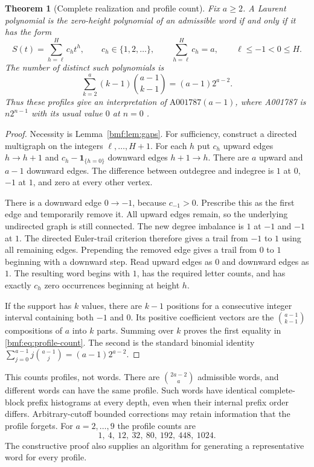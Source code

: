 \documentclass[11pt]{article}
\numberwithin{equation}{section}
\newtheorem{theorem}{Theorem}[section]
\theoremstyle{definition}
\theoremstyle{remark}
\begin{document}
\begin{theorem}[Complete realization and profile count]
\label{bmf:thm:realization}
Fix $a\geq2$. A Laurent polynomial is the zero-height polynomial of
an admissible word if and only if it has the form
\[
 S(t)=\sum_{h=\ell}^{H}c_h t^h,\qquad
 c_h\in\{1,2,\ldots\},\qquad
 \sum_{h=\ell}^{H}c_h=a,\qquad \ell\leq-1<0\leq H.
\]
The number of distinct such polynomials is
\begin{equation}\label{bmf:eq:profile-count}
 \sum_{k=2}^{a}(k-1)\binom{a-1}{k-1}
 =(a-1)2^{a-2}.
\end{equation}
Thus these profiles give an interpretation of
$\mathrm{A001787}(a-1)$, where A001787 is $n2^{n-1}$
with its usual value $0$ at $n=0$ \cite{oeis1787}.
\end{theorem}
\begin{proof}
Necessity is Lemma~\ref{bmf:lem:gaps}. For sufficiency, construct a
directed multigraph on the integers $\ell,\ldots,H+1$.
For each $h$ put $c_h$ upward edges $h\to h+1$ and
$c_h-\mathbf1_{\{h=0\}}$ downward edges $h+1\to h$.
There are $a$ upward and $a-1$ downward edges. The difference
between outdegree and indegree is $1$ at $0$, $-1$ at $1$,
and zero at every other vertex.

There is a downward edge $0\to-1$, because $c_{-1}>0$.
Prescribe this as the first edge and temporarily remove it.
All upward edges remain, so the underlying undirected graph is
still connected. The new degree imbalance is $1$ at $-1$ and
$-1$ at $1$. The directed Euler-trail criterion therefore gives
a trail from $-1$ to $1$ using all remaining edges. Prepending
the removed edge gives a trail from $0$ to $1$ beginning with a
downward step. Read upward edges as $0$ and downward edges as
$1$. The resulting word begins with $1$, has the required letter
counts, and has exactly $c_h$ zero occurrences beginning at height
$h$.

If the support has $k$ values, there are $k-1$ positions for a
consecutive integer interval containing both $-1$ and $0$.
Its positive coefficient vectors are the
$\binom{a-1}{k-1}$ compositions of $a$ into $k$ parts. Summing
over $k$ proves the first equality in \eqref{bmf:eq:profile-count}.
The second is the standard binomial identity
$\sum_{j=0}^{a-1}j\binom{a-1}{j}=(a-1)2^{a-2}$.
\end{proof}

This counts profiles, not words. There are
$\binom{2a-2}{a}$ admissible words, and different words can
have the same profile. Such words have identical complete-block
prefix histograms at every depth, even when their internal
prefix order differs. Arbitrary-cutoff bounded corrections may
retain information that the profile forgets.
For $a=2,\ldots,9$ the profile counts are
\[
 1,\ 4,\ 12,\ 32,\ 80,\ 192,\ 448,\ 1024.
\]
The constructive proof also supplies an algorithm for generating
a representative word for every profile.
\end{document}
